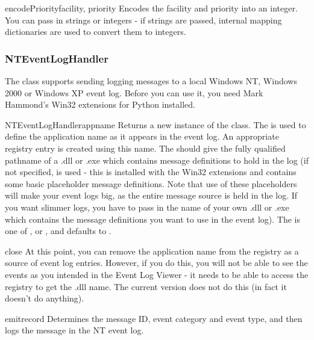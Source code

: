 \begin{methoddesc}{encodePriority}{facility, priority}
Encodes the facility and priority into an integer. You can pass in strings
or integers - if strings are passed, internal mapping dictionaries are used
to convert them to integers.
\end{methoddesc}

\subsubsection{NTEventLogHandler}

The  class supports sending logging messages
to a local Windows NT, Windows 2000 or Windows XP event log. Before
you can use it, you need Mark Hammond's Win32 extensions for Python
installed.

\begin{classdesc}{NTEventLogHandler}{appname
                                     }
Returns a new instance of the  class. The
 is used to define the application name as it appears in the
event log. An appropriate registry entry is created using this name.
The  should give the fully qualified pathname of a .dll or .exe
which contains message definitions to hold in the log (if not specified,
 is used - this is installed with the Win32
extensions and contains some basic placeholder message definitions.
Note that use of these placeholders will make your event logs big, as the
entire message source is held in the log. If you want slimmer logs, you have
to pass in the name of your own .dll or .exe which contains the message
definitions you want to use in the event log). The  is one of
,  or , and
defaults to .
\end{classdesc}

\begin{methoddesc}{close}{}
At this point, you can remove the application name from the registry as a
source of event log entries. However, if you do this, you will not be able
to see the events as you intended in the Event Log Viewer - it needs to be
able to access the registry to get the .dll name. The current version does
not do this (in fact it doesn't do anything).
\end{methoddesc}

\begin{methoddesc}{emit}{record}
Determines the message ID, event category and event type, and then logs the
message in the NT event log.
\end{methoddesc}


